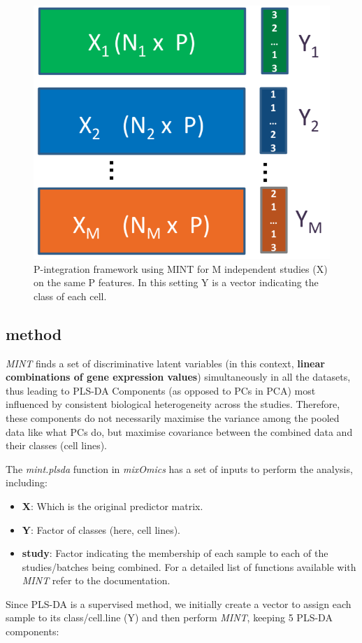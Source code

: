 \documentclass[]{book}
\providecommand{\tightlist}{%
  \setlength{\itemsep}{0pt}\setlength{\parskip}{0pt}}
\theoremstyle{definition}
\theoremstyle{definition}
\theoremstyle{definition}
\theoremstyle{remark}
\begin{document}
\begin{figure}[ht]

{\centering \includegraphics[width=0.3\linewidth]{figures/mintframework} 

}

\caption{P-integration framework using MINT for M independent studies (X) on the same P features. In this setting Y is a vector indicating the class of each cell.}\label{fig:unnamed-chunk-28}
\end{figure}

\hypertarget{method}{%
\subsection{method}\label{method}}

\emph{MINT} finds a set of discriminative latent variables (in this
context, \textbf{linear combinations of gene expression values})
simultaneously in all the datasets, thus leading to PLS-DA Components
(as opposed to PCs in PCA) most influenced by consistent biological
heterogeneity across the studies. Therefore, these components do not
necessarily maximise the variance among the pooled data like what PCs
do, but maximise covariance between the combined data and their classes
(cell lines).

The \emph{mint.plsda} function in \emph{mixOmics} has a set of inputs to
perform the analysis, including:

\begin{itemize}
\tightlist
\item
  \textbf{X}: Which is the original predictor matrix.
\item
  \textbf{Y}: Factor of classes (here, cell lines).
\item
  \textbf{study}: Factor indicating the membership of each sample to
  each of the studies/batches being combined. For a detailed list of
  functions available with \emph{MINT} refer to the documentation.
\end{itemize}

Since PLS-DA is a supervised method, we initially create a vector to
assign each sample to its class/cell.line (Y) and then perform
\emph{MINT}, keeping 5 PLS-DA components:
\end{document}
